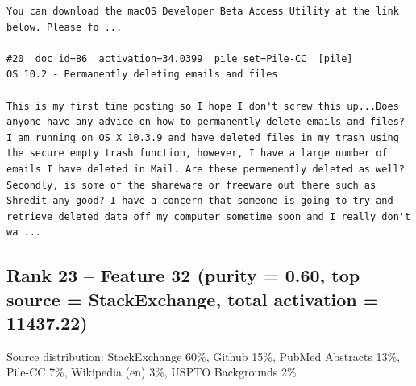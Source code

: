 \begin{verbatim}
You can download the macOS Developer Beta Access Utility at the link below. Please fo ...

#20  doc_id=86  activation=34.0399  pile_set=Pile-CC  [pile]
OS 10.2 - Permanently deleting emails and files

This is my first time posting so I hope I don't screw this up...Does anyone have any advice on how to permanently delete emails and files? I am running on OS X 10.3.9 and have deleted files in my trash using the secure empty trash function, however, I have a large number of emails I have deleted in Mail. Are these permenently deleted as well? Secondly, is some of the shareware or freeware out there such as Shredit any good? I have a concern that someone is going to try and retrieve deleted data off my computer sometime soon and I really don't wa ...

\end{verbatim}

\subsection*{Rank 23 -- Feature 32 (purity = 0.60, top source = StackExchange, total activation = 11437.22)}

Source distribution: StackExchange 60\%, Github 15\%, PubMed Abstracts 13\%, Pile-CC 7\%, Wikipedia (en) 3\%, USPTO Backgrounds 2\%

